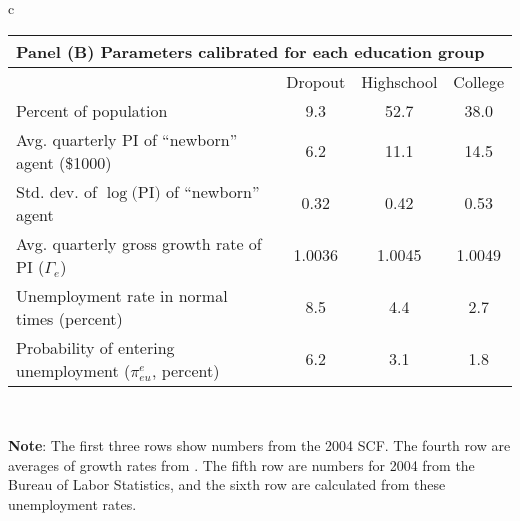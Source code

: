 \documentclass[\econtexRoot/HAFiscal]{subfiles}
\begin{document}
{\begin{table}[p]
\begin{tabular}{c}
        \begin{tabular}{lccc}
          \toprule 
          \multicolumn{4}{l}{Panel (B) Parameters calibrated for each education group} \\ \midrule
          & Dropout & Highschool & College \\ \midrule
          Percent of population & \phantom{0}9.3 & 52.7 & 38.0 \\ 
          Avg. quarterly PI of ``newborn'' agent (\$1000) & \phantom{0}6.2 & 11.1 & 14.5 \\
          Std. dev. of $\log($PI$)$ of ``newborn'' agent & 0.32 & 0.42 & 0.53 \\
          Avg. quarterly gross growth rate of PI ($\Gamma_e$) & 1.0036 & 1.0045 & 1.0049 \\
          Unemployment rate in normal times (percent) & \phantom{0}8.5 & \phantom{0}4.4 & \phantom{0}2.7 \\ 
          Probability of entering unemployment ($\pi_{eu}^{e}$, percent) & \phantom{0}6.2 & \phantom{0}3.1 & \phantom{0}1.8 
          \\ \bottomrule 
        \end{tabular} \\
        \ifdefined\HCode
        \fi
        \parbox{16cm}{\footnotesize \vspace{.25cm} \textbf{Note}: The first three rows show numbers from the 2004 SCF.
The fourth row are averages of growth rates from \cite{carroll2020modeling}.
The fifth row are numbers for 2004 from the Bureau of Labor Statistics, and the sixth row are calculated from these unemployment rates.\normalsize}
%


\end{tabular}
\end{table}}
\end{document}
